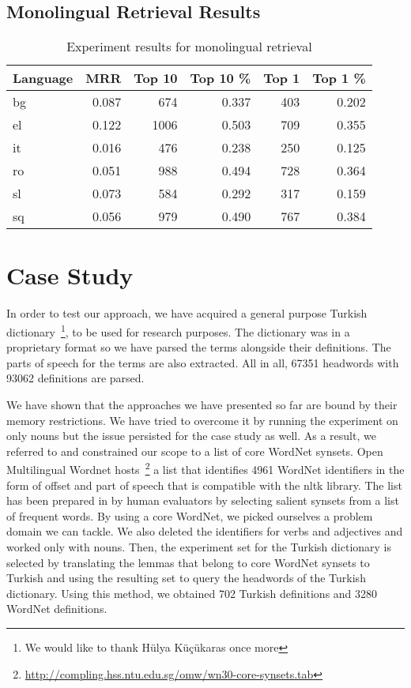 \subsection{Monolingual Retrieval Results}%
\label{sub:chap4_results}

\begin{table}[htbp]
    \centering
    \begin{tabular}{lrrrrr}
        \toprule%
        Language & MRR & Top 10 & Top 10 \% & Top 1 & Top 1 \% \\
        \midrule%
        bg & 0.087 & 674 & 0.337 & 403 & 0.202 \\
        el & 0.122 & 1006 & 0.503 & 709 & 0.355 \\
        it & 0.016 & 476 & 0.238 & 250 & 0.125 \\
        ro & 0.051 & 988 & 0.494 & 728 & 0.364 \\
        sl & 0.073 & 584 & 0.292 & 317 & 0.159 \\
        sq & 0.056 & 979 & 0.490 & 767 & 0.384 \\
        \bottomrule
    \end{tabular}
    \caption{Experiment results for monolingual retrieval}%
    \label{tab:monolingual_tfidf}
\end{table}

\section{Case Study}%
\label{sec:case_study}

In order to test our approach, we have acquired a general purpose Turkish dictionary~\footnote{We would like to thank Hülya Küçükaras once more}, to be used for research purposes.
The dictionary was in a proprietary format so we have parsed the terms alongside their definitions.
The parts of speech for the terms are also extracted.
All in all, 67351 headwords with 93062 definitions are parsed.

We have shown that the approaches we have presented so far are bound by their memory restrictions.
We have tried to overcome it by running the experiment on only nouns but the issue persisted for the case study as well.
As a result, we referred to \textcite{khodak_automated_2017} and constrained our scope to a list of core WordNet synsets.
Open Multilingual Wordnet hosts~\footnote{\url{http://compling.hss.ntu.edu.sg/omw/wn30-core-synsets.tab}} a list that identifies 4961 WordNet identifiers in the form of offset and part of speech that is compatible with the nltk library.
The list has been prepared in \textcite{boyd-graber_adding_2006} by human evaluators by selecting salient synsets from a list of frequent words.
By using a core WordNet, we picked ourselves a problem domain we can tackle.
We also deleted the identifiers for verbs and adjectives and worked only with nouns.
Then, the experiment set for the Turkish dictionary is selected by translating the lemmas that belong to core WordNet synsets to Turkish and using the resulting set to query the headwords of the Turkish dictionary.
Using this method, we obtained 702 Turkish definitions and 3280 WordNet definitions.

